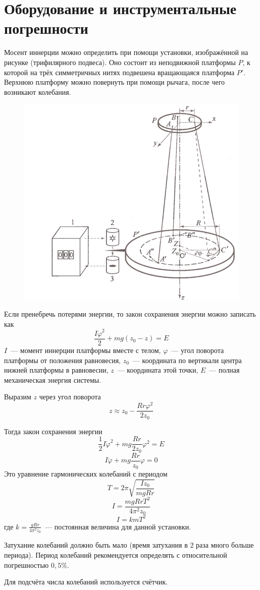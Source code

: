 \section{Оборудование и инструментальные погрешности}

Мосент иннерции можно определить при помощи установки, изображённой на рисунке
(трифилярного подвеса). Оно состоит из неподвижной платформы $P$, к которой на трёх
симметричных нитях подвешена вращающаяся платформа $P'$. Верхнюю платформу можно
повернуть при помощи рычага, после чего возникают колебания.

\begin{figure}[ht!]
    \centering\includegraphics[width=0.8\linewidth]{img/podves.png}
\end{figure}

Если пренебречь потерями энергии, то закон сохранения энергии можно записать как
\[\frac{I\dot{\varphi}^2}{2}+mg\left(z_0-z\right)=E\]
$I$~--- момент иннерции платформы вместе с телом, $\varphi$~--- угол поворота платформы
от положения равновесия, $z_0$~--- координата по вертикали центра нижней платформы в
равновесии, $z$~--- координата этой точки, $E$~--- полная механическая энергия системы.

Выразим $z$ через угол поворота
\[z\approx z_0-\frac{Rr\varphi^2}{2z_0}\]

Тогда закон сохранения энергии
\[\frac{1}{2}I\dot{\varphi}^2+mg\frac{Rr}{2z_0}\varphi^2=E\]
\[I\ddot{\varphi}+mg\frac{Rr}{z_0}\varphi=0\]
Это уравнение гармонических колебаний с периодом
\[T=2\pi\sqrt{\frac{Iz_0}{mgRr}}\]
\[I=\frac{mgRrT^2}{4\pi^2z_0}\]
\[I=kmT^2\]
где $k=\frac{gRr}{4\pi^2z_0}$~--- постоянная величина для данной установки.

Затухание колебаний должно быть мало (время затухания в 2 раза много больше периода).
Период колебаний рекомендуется определять с относительной погрешностью $0{,}5\%$.

Для подсчёта числа колебаний используется счётчик.
